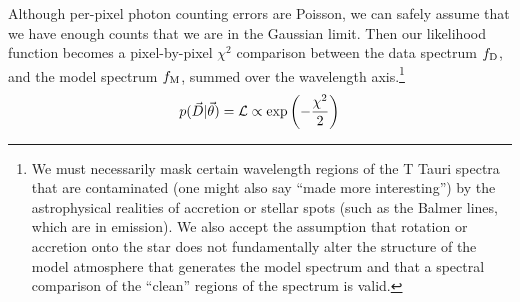 \documentclass[preprint]{aastex} %
\newcommand{\vt}{\vec{\theta}}
\newcommand{\fM}{f_{\rm M}}
\newcommand{\fD}{f_{\rm D}}
\newcommand{\vD}{\vec{D}}
\begin{document}
Although per-pixel photon counting errors are Poisson, we can safely assume that we have enough counts that we are in the Gaussian limit. Then our likelihood function becomes a pixel-by-pixel $\chi^2$ comparison between the data spectrum $\fD$, and the model spectrum $\fM$, summed over the wavelength axis.\footnote{We must necessarily mask certain wavelength regions of the T Tauri spectra that are contaminated (one might also say ``made more interesting'') by the astrophysical realities of accretion or stellar spots (such as the Balmer lines, which are in emission).  We also accept the assumption that rotation or accretion onto the star does not fundamentally alter the structure of the model atmosphere that generates the model spectrum and that a spectral comparison of the ``clean'' regions of the spectrum is valid.} 
\begin{equation}
 p(\vD | \vt) = {\cal L} \propto \exp \left(-\frac{\chi^2}{2} \right)
\end{equation}
\end{document}

